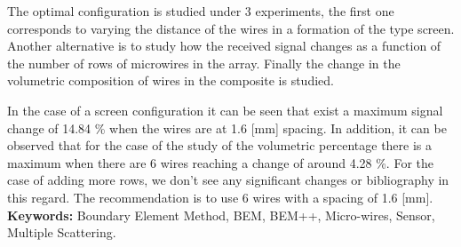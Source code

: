 \documentclass[12pt,letterpaper]{article}
\numberwithin{equation}{section}
\begin{document}
The optimal configuration is studied under 3 experiments, the first one corresponds to varying the distance of the wires in a formation of the type screen. Another alternative is to study how the received signal changes as a function of the number of rows of microwires in the array. Finally the change in the volumetric composition of wires in the composite is studied.

In the case of a screen configuration it can be seen that exist a maximum signal change of 14.84 \% when the wires are at 1.6 [mm] spacing. In addition, it can be observed that for the case of the study of the volumetric percentage there is a maximum when there are 6 wires reaching a change of around 4.28 \%. For the case of adding more rows, we don't see any significant changes or bibliography in this regard. The recommendation is to use 6 wires with a spacing of 1.6 [mm].\\

\noindent\textbf{Keywords:} Boundary Element Method, BEM, BEM++, Micro-wires, Sensor,\\ Multiple Scattering.
\pagebreak
\end{document}
